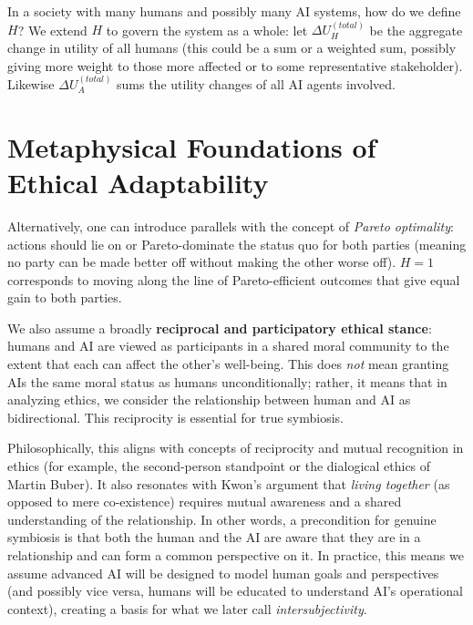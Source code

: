 \documentclass[12pt]{article}
\begin{document}
In a society with many humans and possibly many AI systems, how do we define $H$? We extend $H$ to govern the system as a whole: let $\Delta U_H^{(total)}$ be the aggregate change in utility of all humans (this could be a sum or a weighted sum, possibly giving more weight to those more affected or to some representative stakeholder). Likewise $\Delta U_A^{(total)}$ sums the utility changes of all AI agents involved.

\newpage




\section{Metaphysical Foundations of Ethical Adaptability}

Alternatively, one can introduce parallels with the concept of \emph{Pareto optimality}: actions should lie on or Pareto-dominate the status quo for both parties (meaning no party can be made better off without making the other worse off). $H=1$ corresponds to moving along the line of Pareto-efficient outcomes that give equal gain to both parties. 

We also assume a broadly \textbf{reciprocal and participatory ethical stance}: humans and AI are viewed as participants in a shared moral community to the extent that each can affect the other’s well-being. This does \emph{not} mean granting AIs the same moral status as humans unconditionally; rather, it means that in analyzing ethics, we consider the relationship between human and AI as bidirectional. This reciprocity is essential for true symbiosis.

Philosophically, this aligns with concepts of reciprocity and mutual recognition in ethics (for example, the second-person standpoint or the dialogical ethics of Martin Buber). It also resonates with Kwon’s argument that \emph{living together} (as opposed to mere co-existence) requires mutual awareness and a shared understanding of the relationship. In other words, a precondition for genuine symbiosis is that both the human and the AI are aware that they are in a relationship and can form a common perspective on it. In practice, this means we assume advanced AI will be designed to model human goals and perspectives (and possibly vice versa, humans will be educated to understand AI’s operational context), creating a basis for what we later call \emph{intersubjectivity}.
\end{document}
